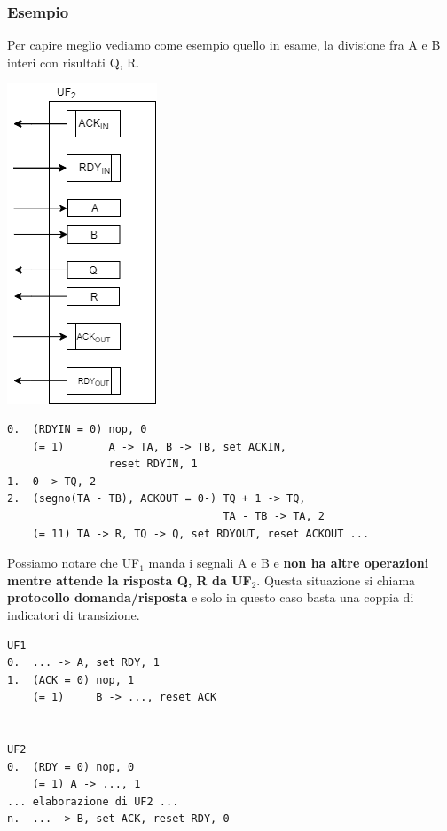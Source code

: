 \documentclass[10pt]{report}
\begin{document}
\subsubsection{Esempio}
Per capire meglio vediamo come esempio quello in esame, la divisione fra A e B interi con risultati Q, R.
\begin{multicols}{2}
\includegraphics[scale=1]{transliv_es.png}
\columnbreak
\begin{center}
\begin{lstlisting}
0.  (RDYIN = 0) nop, 0
    (= 1)       A -> TA, B -> TB, set ACKIN,
                reset RDYIN, 1
1.  0 -> TQ, 2
2.  (segno(TA - TB), ACKOUT = 0-) TQ + 1 -> TQ,
                                  TA - TB -> TA, 2
    (= 11) TA -> R, TQ -> Q, set RDYOUT, reset ACKOUT ...
\end{lstlisting}
\end{center}
Possiamo notare che UF$_1$ manda i segnali A e B e \textbf{non ha altre operazioni mentre attende la risposta Q, R da UF$_2$}. Questa situazione si chiama \textbf{protocollo domanda/risposta} e solo in questo caso basta una coppia di indicatori di transizione.
\begin{center}
\begin{lstlisting}
UF1
0.  ... -> A, set RDY, 1
1.  (ACK = 0) nop, 1
    (= 1)     B -> ..., reset ACK

    
UF2
0.  (RDY = 0) nop, 0
    (= 1) A -> ..., 1
... elaborazione di UF2 ...
n.  ... -> B, set ACK, reset RDY, 0
\end{lstlisting}
\end{center}
\end{multicols}
\pagebreak
\end{document}
